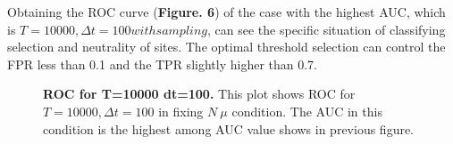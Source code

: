\documentclass[12pt]{article}
\begin{document}
 Obtaining the ROC curve (\textbf{Figure. 6}) of the case with the highest AUC, which is $T=10000, \Delta t=100 with sampling$, can see the specific situation of classifying selection and neutrality of sites. The optimal threshold selection can control the FPR less than 0.1 and the TPR slightly higher than 0.7.

 \begin{figure}[H]
    \centering
    \hspace{-1cm}
    \caption{\textbf{ROC for T=10000 dt=100.} This plot shows ROC for $T=10000, \Delta t=100$ in fixing $N\ \mu$ condition. The AUC in this condition is the highest among AUC value shows in previous figure.}
    \label{fig:AUC_value}
\end{figure}
\end{document}
